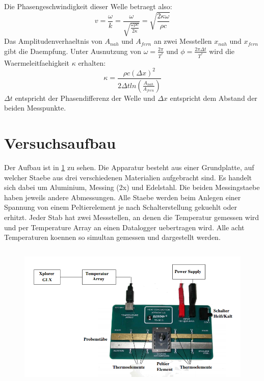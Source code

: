 Die Phasengeschwindigkeit dieser Welle betraegt also:
\begin{equation}
    v=\frac{\omega}{k}=\frac{\omega}{\sqrt{\frac{\omega \rho c}{2\kappa}}}=\sqrt{\frac{2\kappa\omega}{\rho c}}
\end{equation}
Das Amplitudenverhaeltnis von $A_{nah}$ und $A_{fern}$ an zwei Messtellen $x_{nah}$ und $x_{fern}$ gibt die Daempfung. Unter Ausnutzung von $\omega=\frac{2\pi}{T^*}$ und $\phi=\frac{2\pi\Delta t}{T^*}$ wird die Waermeleitfaehigkeit $\kappa$ erhalten:
\begin{equation}
    \kappa=\frac{\rho c (\Delta x)^2}{2\Delta t ln(\frac{A_{nah}}{A_{fern}})}
\end{equation}
$\Delta t$ entspricht der Phasendifferenz der Welle und $\Delta x$ entspricht dem Abstand der beiden Messpunkte.
\section{Versuchsaufbau}
Der Aufbau ist in \ref{Fig:Aufbau} zu sehen. Die Apparatur besteht aus einer Grundplatte, auf welcher Staebe aus drei verschiedenen Materialien aufgebracht sind. Es handelt sich dabei um Aluminium, Messing (2x) und Edelstahl. Die beiden Messingstaebe haben jeweils andere Abmessungen. Alle Staebe werden beim Anlegen einer Spannung von einem Peltierelement je nach Schalterstellung gekuehlt oder erhitzt. Jeder Stab hat zwei Messstellen, an denen die Temperatur gemessen wird und per Temperature Array an einen Datalogger uebertragen wird. Alle acht Temperaturen koennen so simultan gemessen und dargestellt werden. 
\begin{figure}[H]
    \centering
    \captionsetup{justification=centering}
    \includegraphics[height=7cm]{"Aufbau_Waermeleitung.png"}
    \label{Fig:Aufbau}
\end{figure}
